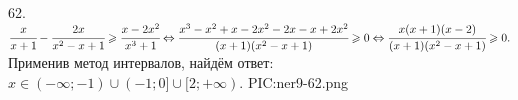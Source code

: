 62. $\cfrac{x}{x+1}-\cfrac{2x}{x^2-x+1}\geqslant\cfrac{x-2x^2}{x^3+1}\Leftrightarrow \cfrac{x^3-x^2+x-2x^2-2x-x+2x^2}{(x+1)(x^2-x+1)}\geqslant0
\Leftrightarrow \cfrac{x(x+1)(x-2)}{(x+1)(x^2-x+1)}\geqslant0.$ Применив метод интервалов, найдём ответ: $x\in (-\infty;-1)\cup(-1;0]\cup[2;+\infty).$
{{PIC:ner9-62.png}}\\
